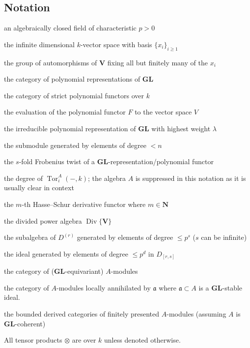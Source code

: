 \documentclass[12pt]{amsart}
\newcommand{\rD}{\mathrm{D}}
\newcommand{\bN}{\mathbf{N}}
\newcommand{\bV}{\mathbf{V}}
\newcommand{\fa}{\mathfrak{a}}
\DeclareMathOperator{\Div}{Div}
\DeclareMathOperator{\Tor}{Tor}
\DeclareMathOperator{\Mod}{Mod}
\newcommand{\pol}{\mathrm{pol}}
\newcommand{\Pol}{\mathbf{Pol}_k}
\DeclareMathOperator{\Sh}{\bf{\Sigma}}
\DeclareMathOperator{\Rep}{Rep}
\DeclareMathOperator{\fpre}{fp}
\newcommand{\Dr}{D^{(r)}}
\newcommand{\Drs}{D_{[r,s]}}
\newcommand{\Jrd}{J_{[r,d]}}
\newcommand{\GL}{\mathbf{GL}}
\numberwithin{equation}{section}
\theoremstyle{definition}
\theoremstyle{plain}
\begin{document}
\subsection{Notation}
\begin{description}[align=right,labelwidth=2.5cm,leftmargin=!]
\item[$k$] an algebraically closed field of characteristic $p > 0$
\item[$\bV$] the infinite dimensional $k$-vector space with basis $\{x_i\}_{i \ge 1}$
\item[$\GL$] the group of automorphisms of $\bV$ fixing all but finitely many of the $x_i$
\item[$\Rep^\pol(\GL)$] the category of polynomial representations of $\GL$
\item[$\Pol$] the category of strict polynomial functors over $k$
\item[$F\{V\}$] the evaluation of the polynomial functor $F$ to the vector space $V$
\item[$L_{\lambda}$] the irreducible polynomial representation of $\GL$ with highest weight $\lambda$
\item[$-^{<n}$] the submodule generated by elements of degree $< n$
\item[$-^{(s)}$] the $s$-fold Frobenius twist of a $\GL$-representation/polynomial functor
\item[$t_i(-)$] the degree of $\Tor_i^A(-, k)$; the algebra $A$ is suppressed in this notation as it is usually clear in context
\item[$\Sh_m$] the $m$-th Hasse--Schur derivative functor where $m \in \bN$
\item[$D$] the divided power algebra $\Div\{\bV\}$
\item[$\Drs$] the subalgebra of $\Dr$ generated by elements of degree $\leq p^s$ ($s$ can be infinite)
\item[$\Jrd$] the ideal generated by elements of degree $\leq p^d$ in $\Drs$
\item[$\Mod_A$] the category of ($\GL$-equivariant) $A$-modules
\item[{$\Mod_A[\fa^{\infty}]$}] the category of $A$-modules locally annihilated by $\fa$ where $\fa \subset A$ is a $\GL$-stable ideal.
\item[$\rD^b_{\fpre}(\Mod_A)$] the bounded derived categories of finitely presented $A$-modules (assuming $A$ is $\GL$-coherent)
\end{description}
All tensor products $\otimes$ are over $k$ unless denoted otherwise.
\end{document}
